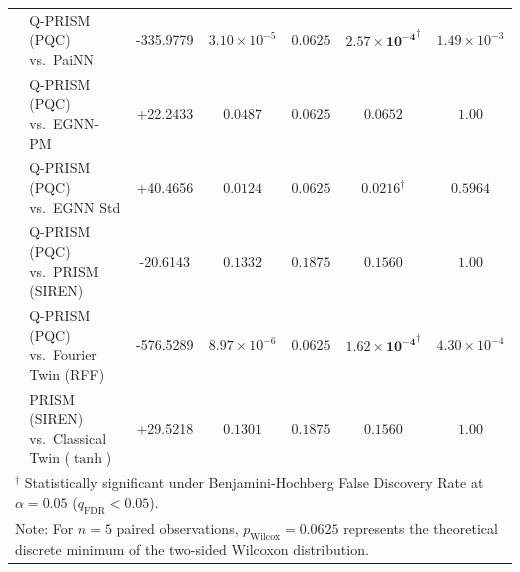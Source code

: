 \begin{table}[p]
{\begin{tabular}{llccccc}
 & Q-PRISM (PQC) vs.\ PaiNN & -335.9779 & $3.10 \times 10^{-5}$ & $0.0625$ & $\mathbf{2.57 \times 10^{-4}}^{\dagger}$ & $1.49 \times 10^{-3}$ \\
 & Q-PRISM (PQC) vs.\ EGNN-PM & +22.2433 & $0.0487$ & $0.0625$ & $0.0652$ & $1.00$ \\
 & Q-PRISM (PQC) vs.\ EGNN Std & +40.4656 & $0.0124$ & $0.0625$ & $\mathbf{0.0216}^{\dagger}$ & $0.5964$ \\
 & Q-PRISM (PQC) vs.\ PRISM (SIREN) & -20.6143 & $0.1332$ & $0.1875$ & $0.1560$ & $1.00$ \\
 & Q-PRISM (PQC) vs.\ Fourier Twin (RFF) & -576.5289 & $8.97 \times 10^{-6}$ & $0.0625$ & $\mathbf{1.62 \times 10^{-4}}^{\dagger}$ & $4.30 \times 10^{-4}$ \\
 & PRISM (SIREN) vs.\ Classical Twin ($\tanh$) & +29.5218 & $0.1301$ & $0.1875$ & $0.1560$ & $1.00$ \\
\bottomrule
\multicolumn{7}{l}{\footnotesize $^{\dagger}$ Statistically significant under Benjamini-Hochberg False Discovery Rate at $\alpha = 0.05$ ($q_{\mathrm{FDR}} < 0.05$).} \\
\multicolumn{7}{l}{\footnotesize Note: For $n = 5$ paired observations, $p_{\mathrm{Wilcox}} = 0.0625$ represents the theoretical discrete minimum of the two-sided Wilcoxon distribution.} \\
\end{tabular}%
}
\end{table}
